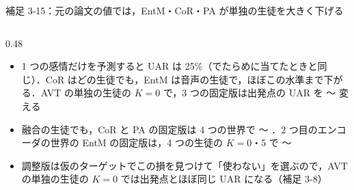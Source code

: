 \begin{frame}{補足 3-15：元の論文の値では，EntM・CoR・PA が単独の生徒を大きく下げる}
\begin{columns}[T,onlytextwidth]
\begin{column}{0.48\textwidth}
\begin{itemize}
        \item 1 つの感情だけを予測すると UAR は 25\%（でたらめに当てたときと同じ）．CoR はどの生徒でも，EntM は音声の生徒で，ほぼこの水準まで下がる．AVT の単独の生徒の $K=0$ で，3 つの固定版は出発点の UAR を 〜 \pt 変える
        \item 融合の生徒でも，CoR と PA の固定版は 4 つの世界で 〜 \pt．2 つ目のエンコーダの世界の EntM の固定版は，4 つの生徒の $K=0$・5 で 〜 \pt
        \item 調整版は仮のターゲットでこの損を見つけて「使わない」を選ぶので，AVT の単独の生徒の $K=0$ では出発点とほぼ同じ UAR になる（補足 3-8）
      \end{itemize}
    \end{column}
  \end{columns}
\end{frame}

